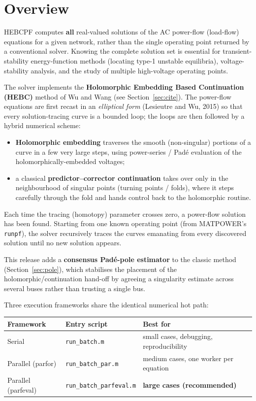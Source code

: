 \documentclass[11pt,a4paper]{article}
\newcommand{\code}[1]{\texttt{#1}}
\begin{document}
\section{Overview}

HEBCPF computes \textbf{all} real-valued solutions of the AC power-flow (load-flow)
equations for a given network, rather than the single operating point returned by a
conventional solver. Knowing the complete solution set is essential for
transient-stability energy-function methods (locating type-1 unstable equilibria),
voltage-stability analysis, and the study of multiple high-voltage operating points.

The solver implements the \textbf{Holomorphic Embedding Based Continuation (HEBC)}
method of Wu and Wang (see Section~\ref{sec:cite}). The power-flow equations are first
recast in an \emph{elliptical form} (Lesieutre and Wu, 2015) so that every
solution-tracing curve is a
bounded loop; the loops are then followed by a hybrid numerical scheme:

\begin{itemize}[leftmargin=1.4em]
  \item \textbf{Holomorphic embedding} traverses the smooth (non-singular) portions of
        a curve in a few very large steps, using power-series / Pad\'e evaluation of the
        holomorphically-embedded voltages;
  \item a classical \textbf{predictor--corrector continuation} takes over only in the
        neighbourhood of singular points (turning points / folds), where it steps
        carefully through the fold and hands control back to the holomorphic routine.
\end{itemize}

Each time the tracing (homotopy) parameter crosses zero, a power-flow solution has been
found. Starting from one known operating point (from MATPOWER's \code{runpf}), the solver
recursively traces the curves emanating from every discovered solution until no new
solution appears.

This release adds a \textbf{consensus Pad\'e-pole estimator} to the classic method
(Section~\ref{sec:pole}), which stabilises the placement of the holomorphic/continuation
hand-off by agreeing a singularity estimate across several buses rather than trusting a
single bus.

Three execution frameworks share the identical numerical hot path:

\begin{center}
\begin{tabular}{@{}lll@{}}
\toprule
Framework & Entry script & Best for\\
\midrule
Serial            & \code{run_batch.m}          & small cases, debugging, reproducibility\\
Parallel (parfor) & \code{run_batch_par.m}      & medium cases, one worker per equation\\
Parallel (parfeval)& \code{run_batch_parfeval.m} & \textbf{large cases (recommended)}\\
\bottomrule
\end{tabular}
\end{center}
\end{document}
